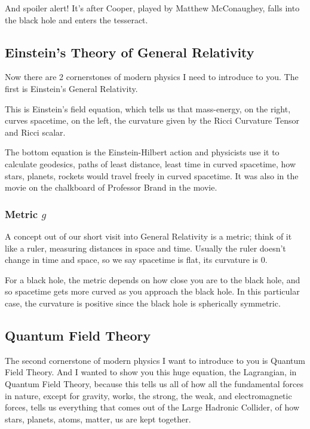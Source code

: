 \documentclass[10pt]{amsart}
\begin{document}
And spoiler alert! It's after Cooper, played by Matthew McConaughey, falls into the black hole and enters the tesseract.

\subsection{Einstein's Theory of General Relativity}

Now there are 2 cornerstones of modern physics I need to introduce to you. The first is Einstein's General Relativity.

This is Einstein's field equation, which tells us that mass-energy, on the right, curves spacetime, on the left, the curvature given by the Ricci Curvature Tensor and Ricci scalar.

The bottom equation is the Einstein-Hilbert action and physicists use it to calculate geodesics, paths of least distance, least time in curved spacetime, how stars, planets, rockets would travel freely in curved spacetime. It was also in the movie on the chalkboard of Professor Brand in the movie.

\subsubsection{Metric $g$}

A concept out of our short visit into General Relativity is a metric; think of it like a ruler, measuring distances in space and time. Usually the ruler doesn't change in time and space, so we say spacetime is flat, its curvature is 0.

For a black hole, the metric depends on how close you are to the black hole, and so spacetime gets more curved as you approach the black hole. In this particular case, the curvature is positive since the black hole is spherically symmetric.

\subsection{Quantum Field Theory}

The second cornerstone of modern physics I want to introduce to you is Quantum Field Theory. And I wanted to show you this huge equation, the Lagrangian, in Quantum Field Theory, because this tells us all of how all the fundamental forces in nature, except for gravity, works, the strong, the weak, and electromagnetic forces, tells us everything that comes out of the Large Hadronic Collider, of how stars, planets, atoms, matter, us are kept together.
\end{document}
